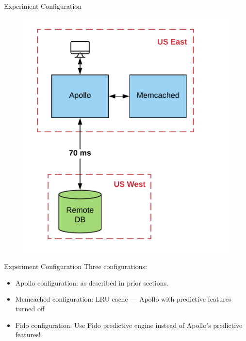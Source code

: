 \documentclass[12pt]{beamer}
\begin{document}
\begin{frame}[fragile]{Experiment Configuration}
    \begin{figure}
        \center
        \includegraphics[scale=0.17]{apollo_exp_config}
    \end{figure}
\end{frame}

\begin{frame}[fragile]{Experiment Configuration}
    Three configurations:
    \begin{itemize}
        \item{\alert{Apollo configuration:} as described in prior sections.}
        \item{\alert{Memcached configuration:} LRU cache --- Apollo with predictive features turned off}
        \item{\alert{Fido configuration:} Use Fido predictive engine instead of Apollo's predictive features!}
    \end{itemize}
\end{frame}
\end{document}
